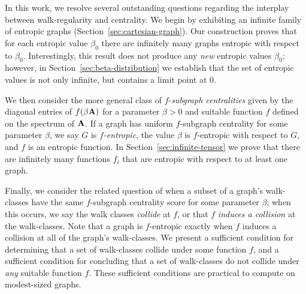 In this work, we resolve several outstanding questions regarding the interplay between
walk-regularity and centrality. We begin by exhibiting an infinite family of entropic graphs (Section~\ref{sec:cartesian-graph}).
Our construction proves that for each entropic value $\beta_0$ there are infinitely many graphs entropic with respect to $\beta_0$.
Interestingly, this result does not produce any \emph{new} entropic values $\beta_0$;
however, in Section~\ref{sec:beta-distribution}
we establish that the set of entropic values is not only infinite, but contains a limit point at 0.

We then consider the more general class of $f$-\emph{subgraph centralities} given by the
diagonal entries of $f(\beta\textbf{A})$ for a parameter $\beta > 0$ and suitable function $f$ defined on the spectrum of $\textbf{A}$.
If a graph has uniform $f$-subgraph centrality for some parameter $\beta$,
we say $G$ is \emph{$f$-entropic}, the value $\beta$ is $f$-entropic with respect to $G$, and $f$ is an entropic function.
In Section~\ref{sec:infinite-tensor} we prove that there are infinitely many functions $f_i$ that are entropic with respect to at least one graph.

Finally, we consider the related question of when a subset of a graph's walk-classes
have the same $f$-subgraph centrality score for some parameter $\beta$;
when this occurs, we say the walk classes \emph{collide} at $f$,
or that $f$ \emph{induces a collision} at the walk-classes.
Note that a graph is $f$-entropic exactly when $f$ induces a collision at all of the graph's walk-classes.
We present a sufficient condition for determining that a set of walk-classes collide under some function $f$,
and a sufficient condition for concluding that a set of walk-classes do not collide under \emph{any} suitable function $f$.
These sufficient conditions are practical to compute on modest-sized graphs.
